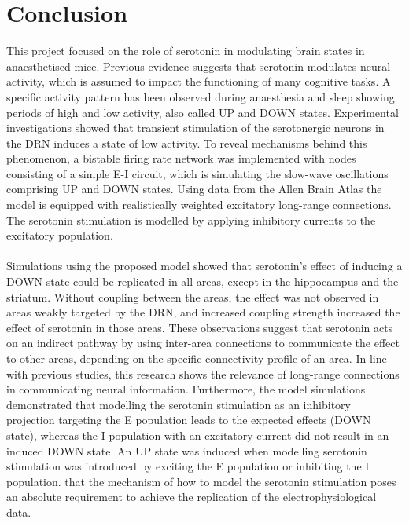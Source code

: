 
\chapter{Conclusion\label{cha:chapter7}}
\noindent
\indent 
This project focused on the role of serotonin in modulating brain states in anaesthetised mice. Previous evidence suggests that serotonin modulates neural activity, which is assumed to impact the functioning of many cognitive tasks. A specific activity pattern has been observed during anaesthesia and sleep showing periods of high and low activity, also called UP and DOWN states. Experimental investigations showed that transient stimulation of the serotonergic neurons in the DRN induces a state of low activity. To reveal mechanisms behind this phenomenon, a bistable firing rate network was implemented with nodes consisting of a simple E-I circuit, which is simulating the slow-wave oscillations comprising UP and DOWN states. Using data from the Allen Brain Atlas the model is equipped with realistically weighted excitatory long-range connections. The serotonin stimulation is modelled by applying inhibitory currents to the excitatory population. 
\\
\\
\indent Simulations using the proposed model showed that serotonin's effect of inducing a DOWN state could be replicated in all areas, except in the hippocampus and the striatum. Without coupling between the areas, the effect was not observed in areas weakly targeted by the DRN, and increased coupling strength increased the effect of serotonin in those areas. These observations suggest that serotonin acts on an indirect pathway by using inter-area connections to communicate the effect to other areas, depending on the specific connectivity profile of an area. In line with previous studies, this research shows the relevance of long-range connections in communicating neural information. Furthermore, the model simulations demonstrated that modelling the serotonin stimulation as an inhibitory projection targeting the E population leads to the expected effects (DOWN state), whereas the I population with an excitatory current did not result in an induced DOWN state. An UP state was induced when modelling serotonin stimulation was introduced by exciting the E population or inhibiting the I population. that the mechanism of how to model the serotonin stimulation poses an absolute requirement to achieve the replication of the electrophysiological data. 
\\
\\

